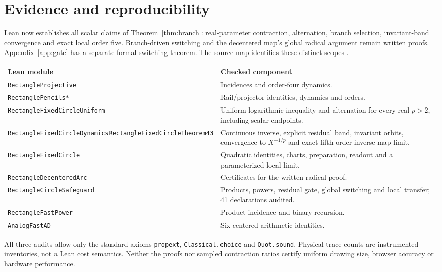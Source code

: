 \documentclass[11pt,a4paper]{article}
\begin{document}
\section{Evidence and reproducibility}\label{sec:scope}
Lean now establishes all scalar claims of Theorem~\ref{thm:branch}: real-parameter contraction, alternation, branch selection, invariant-band convergence and exact local order five. Branch-driven switching and the decentered map's global radical argument remain written proofs. Appendix~\ref{app:gate} has a separate formal switching theorem. The source map identifies these distinct scopes \cite{lean4,mathlib}.
\begin{center}\small
\begin{tabularx}{\linewidth}{@{}p{.34\linewidth}X@{}}\toprule
Lean module & Checked component\\\midrule
\texttt{RectangleProjective} & Incidences and order-four dynamics.\\
\texttt{RectanglePencils*} & Rail/projector identities, dynamics and orders.\\
\texttt{RectangleFixedCircle}\allowbreak\texttt{Uniform} & Uniform logarithmic inequality and alternation for every real $p>2$, including scalar endpoints.\\
\texttt{RectangleFixedCircle}\allowbreak\texttt{Dynamics}\newline\texttt{RectangleFixedCircle}\allowbreak\texttt{Theorem43} & Continuous inverse, explicit residual band, invariant orbits, convergence to $X^{-1/p}$ and exact fifth-order inverse-map limit.\\
\texttt{RectangleFixedCircle} & Quadratic identities, charts, preparation, readout and a parameterized local limit.\\
\texttt{RectangleDecenteredArc} & Certificates for the written radical proof.\\
\texttt{RectangleCircleSafeguard} & Products, powers, residual gate, global switching and local transfer; 41 declarations audited.\\
\texttt{RectangleFastPower} & Product incidence and binary recursion.\\
\texttt{AnalogFastAD} & Six centered-arithmetic identities.\\\bottomrule
\end{tabularx}\end{center}
All three audits allow only the standard axioms \texttt{propext}, \texttt{Classical.choice} and \texttt{Quot.sound}. Physical trace counts are instrumented inventories, not a Lean cost semantics. Neither the proofs nor sampled contraction ratios certify uniform drawing size, browser accuracy or hardware performance.
\end{document}
